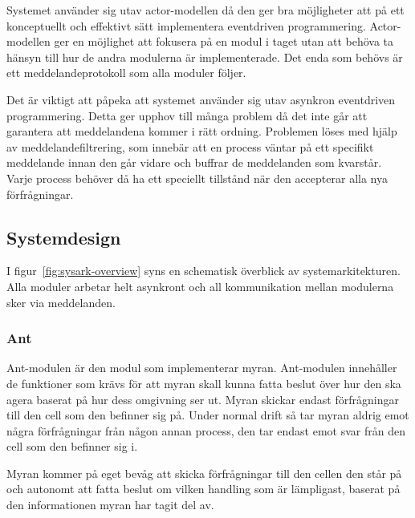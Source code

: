 \documentclass[12pt]{article}
\begin{document}
Systemet använder sig utav actor-modellen då den ger bra möjligheter att på ett konceptuellt och effektivt sätt implementera eventdriven programmering.
Actor-modellen ger en möjlighet att fokusera på en modul i taget utan att behöva ta hänsyn till hur de andra modulerna är implementerade.
Det enda som behövs är ett meddelandeprotokoll som alla moduler följer.

Det är viktigt att påpeka att systemet använder sig utav asynkron eventdriven programmering.
Detta ger upphov till många problem då det inte går att garantera att meddelandena kommer i rätt ordning.
Problemen löses med hjälp av meddelandefiltrering,
som innebär att en process väntar på ett specifikt meddelande innan den går vidare och buffrar de meddelanden som kvarstår.
Varje process behöver då ha ett speciellt tillstånd när den accepterar alla nya förfrågningar.

\subsection{Systemdesign}
I figur~\ref{fig:sysark-overview} syns en schematisk överblick av systemarkitekturen.
Alla moduler arbetar helt asynkront och all kommunikation mellan modulerna sker via meddelanden.

\subsubsection{Ant}
Ant-modulen är den modul som implementerar myran.
Ant-modulen innehåller de funktioner som krävs för att myran skall kunna fatta beslut över hur den ska agera baserat på hur dess omgivning ser ut.
Myran skickar endast förfrågningar till den cell som den befinner sig på.
Under normal drift så tar myran aldrig emot några förfrågningar från någon annan process,
den tar endast emot svar från den cell som den befinner sig i.

Myran kommer på eget bevåg att skicka förfrågningar till den cellen den står på och autonomt att fatta beslut om vilken handling som är lämpligast,
baserat på den informationen myran har tagit del av.
\end{document}
